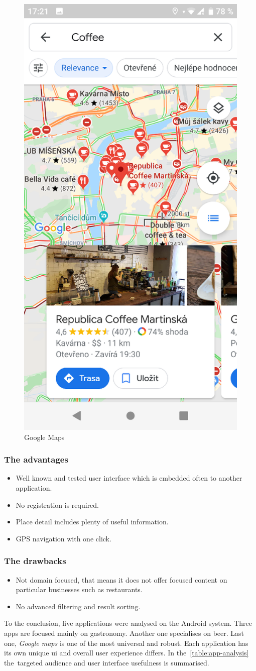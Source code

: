 \begin{figure}[ht]
    \centering
    \includegraphics[width=0.33\linewidth]{img/analysis/gmaps.png}
    \caption{Google Maps}
    \label{fig:google-maps}
\end{figure}

\subsubsection{The advantages}
\begin{itemize}
    \item Well known and tested user interface which is embedded often to another application.
    \item No registration is required.
    \item Place detail includes plenty of useful information.
    \item GPS navigation with one click.
\end{itemize}

\subsubsection{The drawbacks}
\begin{itemize}
    \item Not domain focused, that means it does not offer focused content on particular businesses such as restaurants.
    \item No advanced filtering and result sorting.
\end{itemize}

To the conclusion, five applications were analysed on the Android system. Three apps are focused mainly on gastronomy. Another one specialises on beer. Last one, \textit{Google maps} is one of the most universal and robust. 
Each application has its own unique \gls{ui} and overall user experience differs. In the~\cref{table:app-analysis} the~targeted audience and user interface usefulness is summarised.

